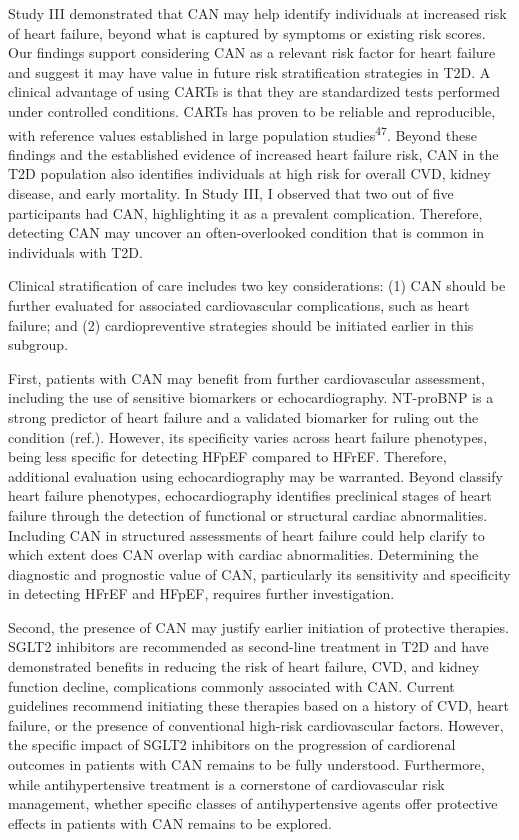 \documentclass[
  a4paper,
  headsepline=true,
  open=any]{scrbook}
\begin{document}
Study III demonstrated that CAN may help identify individuals at
increased risk of heart failure, beyond what is captured by symptoms or
existing risk scores. Our findings support considering CAN as a relevant
risk factor for heart failure and suggest it may have value in future
risk stratification strategies in T2D. A clinical advantage of using
CARTs is that they are standardized tests performed under controlled
conditions. CARTs has proven to be reliable and reproducible, with
reference values established in large population
studies\textsuperscript{47}. Beyond these findings and the established
evidence of increased heart failure risk, CAN in the T2D population also
identifies individuals at high risk for overall CVD, kidney disease, and
early mortality. In Study III, I observed that two out of five
participants had CAN, highlighting it as a prevalent complication.
Therefore, detecting CAN may uncover an often-overlooked condition that
is common in individuals with T2D.

Clinical stratification of care includes two key considerations: (1) CAN
should be further evaluated for associated cardiovascular complications,
such as heart failure; and (2) cardiopreventive strategies should be
initiated earlier in this subgroup.

First, patients with CAN may benefit from further cardiovascular
assessment, including the use of sensitive biomarkers or
echocardiography. NT-proBNP is a strong predictor of heart failure and a
validated biomarker for ruling out the condition (ref.). However, its
specificity varies across heart failure phenotypes, being less specific
for detecting HFpEF compared to HFrEF. Therefore, additional evaluation
using echocardiography may be warranted. Beyond classify heart failure
phenotypes, echocardiography identifies preclinical stages of heart
failure through the detection of functional or structural cardiac
abnormalities. Including CAN in structured assessments of heart failure
could help clarify to which extent does CAN overlap with cardiac
abnormalities. Determining the diagnostic and prognostic value of CAN,
particularly its sensitivity and specificity in detecting HFrEF and
HFpEF, requires further investigation.

Second, the presence of CAN may justify earlier initiation of protective
therapies. SGLT2 inhibitors are recommended as second-line treatment in
T2D and have demonstrated benefits in reducing the risk of heart
failure, CVD, and kidney function decline, complications commonly
associated with CAN. Current guidelines recommend initiating these
therapies based on a history of CVD, heart failure, or the presence of
conventional high-risk cardiovascular factors. However, the specific
impact of SGLT2 inhibitors on the progression of cardiorenal outcomes in
patients with CAN remains to be fully understood. Furthermore, while
antihypertensive treatment is a cornerstone of cardiovascular risk
management, whether specific classes of antihypertensive agents offer
protective effects in patients with CAN remains to be explored.
\end{document}
